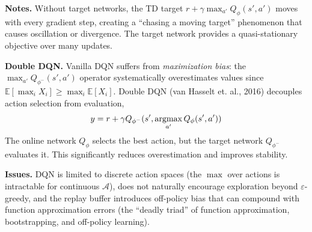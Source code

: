\documentclass[11pt, letterpaper]{article}
\begin{document}
\begin{remark}
    \textbf{Notes.} Without target networks, the TD target \(r + \gamma \max_{a'} Q_\phi(s', a')\) moves with every gradient step, creating a ``chasing a moving target'' phenomenon that causes oscillation or divergence. The target network provides a quasi-stationary objective over many updates.

    \textbf{Double DQN.} Vanilla DQN suffers from \textit{maximization bias}: the \(\max_{a'} Q_{\phi^-}(s', a')\) operator systematically overestimates values since \(\mathbb{E}[\max_i X_i] \geq \max_i \mathbb{E}[X_i]\). Double DQN (van Hasselt et. al., 2016) decouples action selection from evaluation,
    \[
        y = r + \gamma Q_{\phi^-}(s', \operatorname*{argmax}_{a'} Q_\phi(s', a'))
    \]
    The online network \(Q_\phi\) selects the best action, but the target network \(Q_{\phi^-}\) evaluates it. This significantly reduces overestimation and improves stability.

    \textbf{Issues.} DQN is limited to discrete action spaces (the \(\max\) over actions is intractable for continuous \(\mathcal{A}\)), does not naturally encourage exploration beyond \(\varepsilon\)-greedy, and the replay buffer introduces off-policy bias that can compound with function approximation errors (the ``deadly triad'' of function approximation, bootstrapping, and off-policy learning).
\end{remark}
\end{document}
